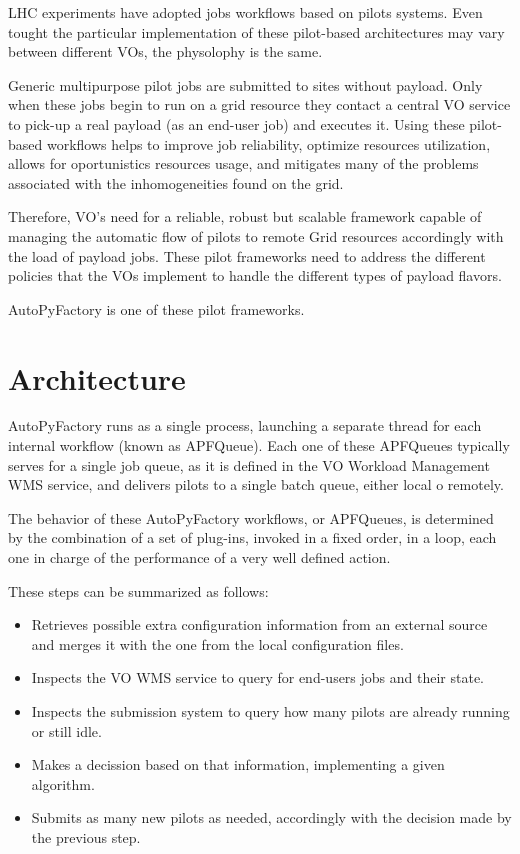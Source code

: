 \documentclass[a4paper]{jpconf}
\begin{document}
LHC experiments have adopted jobs workflows based on pilots systems.
Even tought the particular implementation of these pilot-based architectures may vary 
between different VOs, the physolophy is the same. 

Generic multipurpose pilot jobs are submitted to sites without payload. 
Only when these jobs begin to run on a grid resource they contact a central VO service 
to pick-up a real payload (as an end-user job) and executes it.
Using these pilot-based workflows helps to improve job reliability,
optimize resources utilization, allows for oportunistics resources usage, 
and mitigates many of the problems associated with the inhomogeneities found on the grid.

Therefore, VO's need for a reliable, robust but scalable framework
capable of managing the automatic flow of pilots to remote Grid resources
accordingly with the load of payload jobs.
These pilot frameworks need to address the different policies that the VOs
implement to handle the different types of payload flavors.

AutoPyFactory is one of these pilot frameworks.


\section{Architecture}


AutoPyFactory runs as a single process,
launching a separate thread for each internal workflow (known as APFQueue).
Each one of these APFQueues typically serves for a single job queue, 
as it is defined in the VO Workload Management WMS service, 
and delivers pilots to a single batch queue,
either local o remotely. 


The behavior of these AutoPyFactory workflows, or APFQueues,
is determined by the combination of a set of plug-ins, 
invoked in a fixed order, 
in a loop,   
each one in charge of the performance of a very well defined action.


These steps can be summarized as follows:
\begin{itemize}
    \item Retrieves possible extra configuration information from an external source 
          and merges it with the one from the local configuration files.
    \item Inspects the VO WMS service to query for end-users jobs and their state.
    \item Inspects the submission system to query how many pilots are already running or still idle.
    \item Makes a decission based on that information, implementing a given algorithm. 
    \item Submits as many new pilots as needed, accordingly with the decision made by the previous step.
\end{itemize}
\end{document}
